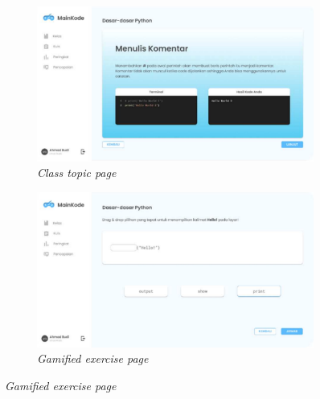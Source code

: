 \newpage
\begin{figure}[htbp]
	\centering
	\begin{subfigure}[b]{0.35\textwidth}
		\centering
	  \includegraphics[width=\linewidth]{contents/chapter-2/images/Evan-a1.png}
	  \caption{\textit{Class topic page}}
	  \label{fig:sub1-a1}
	\end{subfigure}
	\begin{subfigure}[b]{0.35\textwidth}
	\centering
	  \includegraphics[width=\linewidth]{contents/chapter-2/images/Evan-a2.png}
	  \caption{\textit{Gamified exercise page}}

\end{subfigure}
\end{figure}

